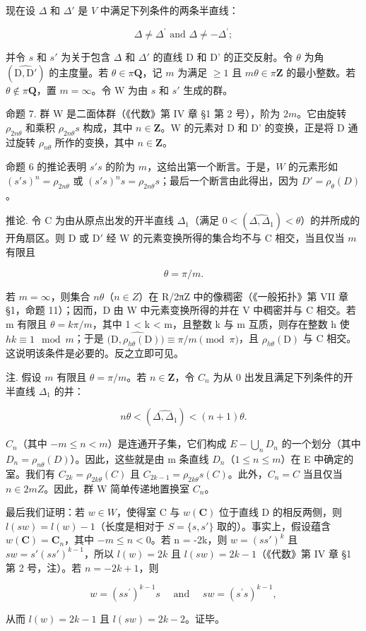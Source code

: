 现在设 \(\Delta\) 和 \(\Delta'\) 是 \(V\) 中满足下列条件的两条半直线：

\[
\Delta \neq \Delta^ {\prime} \text { and } \Delta \neq - \Delta^ {\prime};
\]

并令 \(s\) 和 \(s'\) 为关于包含 \(\Delta\) 和 \(\Delta'\) 的直线 D 和 D' 的正交反射。令 \(\theta\) 为角 \((\widehat{\mathrm{D},\mathrm{D}'})\) 的主度量。若 \(\theta \in \pi\mathbf{Q}\)，记 \(m\) 为满足 \(\geqslant 1\) 且 \(m\theta \in \pi\mathbf{Z}\) 的最小整数。若 \(\theta \notin \pi\mathbf{Q}\)，置 \(m = \infty\)。令 W 为由 \(s\) 和 \(s'\) 生成的群。

命题 7. 群 W 是二面体群（《代数》第 IV 章 §1 第 2 号），阶为 \(2m\)。它由旋转 \(\rho_{2n\theta}\) 和乘积 \(\rho_{2n\theta}s\) 构成，其中 \(n \in \mathbf{Z}\)。W 的元素对 D 和 D' 的变换，正是将 D 通过旋转 \(\rho_{n\theta}\) 所作的变换，其中 \(n \in \mathbf{Z}\)。

命题 6 的推论表明 \(s's\) 的阶为 \(m\)，这给出第一个断言。于是，\(W\) 的元素形如 \((s's)^n = \rho_{2n\theta}\) 或 \((s's)^n s = \rho_{2n\theta}s\)；最后一个断言由此得出，因为 \(D' = \rho_\theta(D)\)。

推论. 令 C 为由从原点出发的开半直线 \(\Delta_{1}\)（满足 \(0 < (\widehat{\Delta, \Delta_{1}}) < \theta\)）的并所成的开角扇区。则 D 或 \(\mathrm{D}'\) 经 W 的元素变换所得的集合均不与 C 相交，当且仅当 \(m\) 有限且

\[
\theta = \pi / m.
\]

若 \(m = \infty\)，则集合 \(n\theta\)（\(n \in Z\)）在 R/2πZ 中的像稠密（《一般拓扑》第 VII 章 §1，命题 11）；因而，D 由 W 中元素变换所得的并在 V 中稠密并与 C 相交。若 m 有限且 \(\theta = k\pi/m\)，其中 1 \textless{} k \textless{} m，且整数 k 与 m 互质，则存在整数 h 使 \(hk \equiv 1 \mod m\)；于是 \((\widehat{\mathrm{D}, \rho_{h\theta}(\mathrm{D}))} \equiv \pi/m \pmod{\pi}\)，且 \(\rho_{h\theta}(\mathrm{D})\) 与 C 相交。这说明该条件是必要的。反之立即可见。

注. 假设 \(m\) 有限且 \(\theta = \pi / m\)。若 \(n \in \mathbf{Z}\)，令 \(C_n\) 为从 0 出发且满足下列条件的开半直线 \(\Delta_1\) 的并：

\[
n \theta <   (\widehat {\Delta , \Delta_ {1}}) <   (n + 1) \theta .
\]

\(C_{n}\)（其中 \(-m \leqslant n < m\)）是连通开子集，它们构成 \(E - \bigcup_{n} D_{n}\) 的一个划分（其中 \(D_{n} = \rho_{n\theta}(D)\)）。因此，这些就是由 m 条直线 \(D_{n}\)（\(1 \leqslant n \leqslant m\)）在 E 中确定的室。我们有 \(C_{2k} = \rho_{2k\theta}(C)\) 且 \(C_{2k-1} = \rho_{2k\theta}s(C)\)。此外，\(C_{n} = C\) 当且仅当 \(n \in 2mZ\)。因此，群 W 简单传递地置换室 \(C_{n}\)。

最后我们证明：若 \(w \in W\)，使得室 C 与 \(w(\mathbf{C})\) 位于直线 D 的相反两侧，则 \(l(sw) = l(w) - 1\)（长度是相对于 \(S = \{s, s'\}\) 取的）。事实上，假设蕴含 \(w(\mathbf{C}) = \mathbf{C}_n\)，其中 \(-m \leqslant n < 0\)。若 n = -2k，则 \(w = (ss')^k\) 且 \(sw = s'(ss')^{k-1}\)，所以 \(l(w) = 2k\) 且 \(l(sw) = 2k - 1\)（《代数》第 IV 章 §1 第 2 号，注）。若 \(n = -2k + 1\)，则

\[
w = \left(s s ^ {\prime}\right) ^ {k - 1} s \quad \text { and } \quad s w = \left(s ^ {\prime} s\right) ^ {k - 1},
\]

从而 \(l(w) = 2k - 1\) 且 \(l(sw) = 2k - 2\)。证毕。

